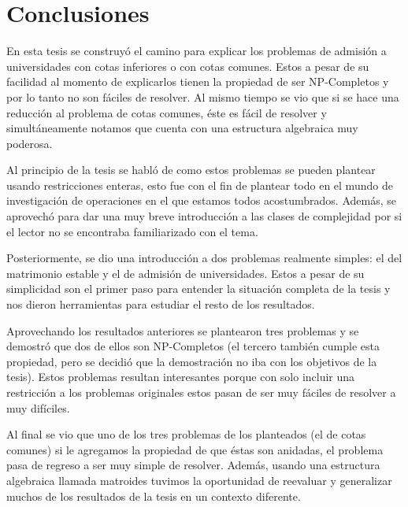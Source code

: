 \chapter{Conclusiones}

En esta tesis se construyó el camino para explicar los problemas de admisión a universidades con cotas inferiores o con cotas comunes. Estos a pesar de su facilidad al momento de explicarlos tienen la propiedad de ser NP-Completos y por lo tanto no son fáciles de resolver. Al mismo tiempo se vio que si se hace una reducción al problema de cotas comunes, éste es fácil de resolver y simultáneamente notamos que cuenta con una estructura algebraica muy poderosa. 

Al principio de la tesis se habló de como estos problemas se pueden plantear usando restricciones enteras, esto fue con el fin de plantear todo en el mundo de investigación de operaciones en el que estamos todos acostumbrados. Además, se aprovechó para dar una muy breve introducción a las clases de complejidad por si el lector no se encontraba familiarizado con el tema. 

Posteriormente, se dio una introducción a dos problemas realmente simples: el del matrimonio estable y el de admisión de universidades. Estos a pesar de su simplicidad son el primer paso para entender la situación completa de la tesis y nos dieron herramientas para estudiar el resto de los resultados. 

Aprovechando los resultados anteriores se plantearon tres problemas y se demostró que dos de ellos son NP-Completos (el tercero también cumple esta propiedad, pero se decidió que la demostración no iba con los objetivos de la tesis). Estos problemas resultan interesantes porque con solo incluir una restricción a los problemas originales estos pasan de ser muy fáciles de resolver a muy difíciles. 

Al final se vio que uno de los tres problemas de los planteados (el de cotas comunes) si le agregamos la propiedad de que éstas son anidadas, el problema pasa de regreso a ser muy simple de resolver. Además, usando una estructura algebraica llamada matroides tuvimos la oportunidad de reevaluar y generalizar muchos de los resultados de la tesis en un contexto diferente. 
